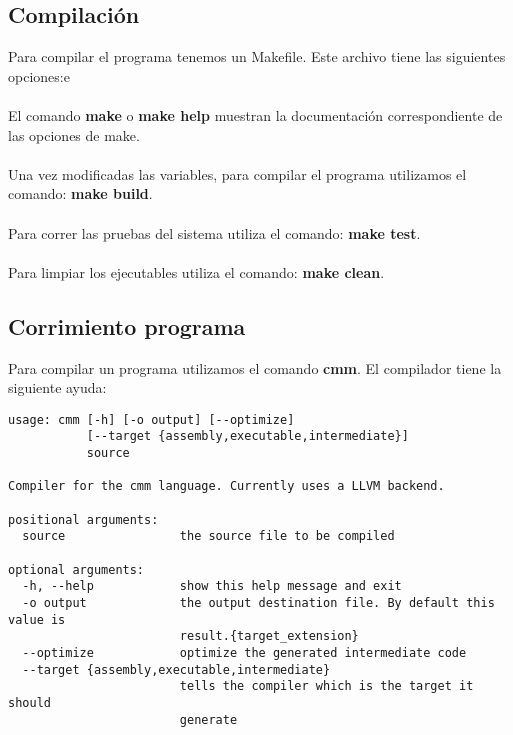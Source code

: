 \documentclass[11pt]{article}
\begin{document}
\subsection{Compilación}

Para compilar el programa tenemos un Makefile. Este archivo tiene las siguientes opciones:e
\\\\
El comando \textbf{make} o \textbf{make help} muestran la documentación correspondiente de las opciones de make.
\\\\
Una vez modificadas las variables, para compilar el programa utilizamos el comando: \textbf{make build}.
\\\\
Para correr las pruebas del sistema utiliza el comando: \textbf{make test}.
\\\\
Para limpiar los ejecutables utiliza el comando: \textbf{make clean}.

\subsection{Corrimiento programa}

Para compilar un programa utilizamos el comando \textbf{cmm}. El compilador tiene la siguiente ayuda:
 
\begin{verbatim}
usage: cmm [-h] [-o output] [--optimize]
           [--target {assembly,executable,intermediate}]
           source

Compiler for the cmm language. Currently uses a LLVM backend.

positional arguments:
  source                the source file to be compiled

optional arguments:
  -h, --help            show this help message and exit
  -o output             the output destination file. By default this value is
                        result.{target_extension}
  --optimize            optimize the generated intermediate code
  --target {assembly,executable,intermediate}
                        tells the compiler which is the target it should
                        generate
\end{verbatim}
\end{document}

